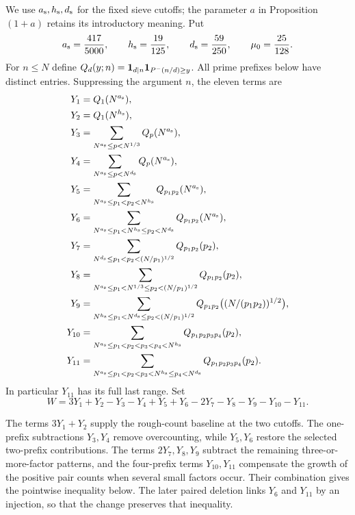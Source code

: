 We use $a_{\rm s},h_{\rm s},d_{\rm s}$ for the fixed sieve cutoffs;
the parameter $a$ in Proposition $(1+a)$ retains its introductory meaning. Put
\[
 {a_{\rm s}}=\frac{417}{5000},\qquad {h_{\rm s}}=\frac{19}{125},\qquad
 {d_{\rm s}}=\frac{59}{250},\qquad \mu_0=\frac{25}{128}.
\]
For $n\le N$ define
$Q_d(y;n)=\mathbf 1_{d\mid n}\mathbf 1_{P^-(n/d)\ge y}$.
All prime prefixes below have distinct entries.  Suppressing the
argument $n$, the eleven terms are
\begingroup\allowdisplaybreaks[4]
\begin{align*}
 Y_1&=Q_1(N^{a_{\rm s}}),\\
 Y_2&=Q_1(N^{h_{\rm s}}),\\
 Y_3&=\sum_{N^{a_{\rm s}}\le p<N^{1/3}}Q_p(N^{a_{\rm s}}),\\
 Y_4&=\sum_{N^{a_{\rm s}}\le p<N^{d_{\rm s}}}Q_p(N^{a_{\rm s}}),\\
 Y_5&=\sum_{N^{a_{\rm s}}\le p_1<p_2<N^{h_{\rm s}}}Q_{p_1p_2}(N^{a_{\rm s}}),\\
 Y_6&=\sum_{N^{a_{\rm s}}\le p_1<N^{h_{\rm s}}\le p_2<N^{d_{\rm s}}}Q_{p_1p_2}(N^{a_{\rm s}}),\\
 Y_7&=\sum_{N^{d_{\rm s}}\le p_1<p_2<(N/p_1)^{1/2}}Q_{p_1p_2}(p_2),\\
 Y_8&=\sum_{N^{a_{\rm s}}\le p_1<N^{1/3}\le p_2<(N/p_1)^{1/2}}
                                          Q_{p_1p_2}(p_2),\\
 Y_9&=\sum_{N^{h_{\rm s}}\le p_1<N^{d_{\rm s}}\le p_2<(N/p_1)^{1/2}}
                   Q_{p_1p_2}\bigl((N/(p_1p_2))^{1/2}\bigr),\\
 Y_{10}&=\sum_{N^{a_{\rm s}}\le p_1<p_2<p_3<p_4<N^{h_{\rm s}}}Q_{p_1p_2p_3p_4}(p_2),\\
 Y_{11}&=\sum_{N^{a_{\rm s}}\le p_1<p_2<p_3<N^{h_{\rm s}}\le p_4<N^{d_{\rm s}}}
                                          Q_{p_1p_2p_3p_4}(p_2).
\end{align*}
\endgroup
In particular $Y_{11}$ has its full last range.  Set
\begin{equation}
 W=3Y_1+Y_2-Y_3-Y_4+Y_5+Y_6-2Y_7-Y_8-Y_9-Y_{10}-Y_{11}.
 \label{eq:current-full-weight}
\end{equation}

The terms $3Y_1+Y_2$ supply the rough-count baseline at the two
cutoffs. The one-prefix subtractions $Y_3,Y_4$ remove overcounting,
while $Y_5,Y_6$ restore the selected two-prefix contributions.
The terms $2Y_7,Y_8,Y_9$ subtract the remaining three-or-more-factor
patterns, and the four-prefix terms $Y_{10},Y_{11}$ compensate the
growth of the positive pair counts when several small factors occur.
Their combination gives the pointwise inequality below. The later
paired deletion links $Y_6$ and $Y_{11}$ by an injection, so that the
change preserves that inequality.

